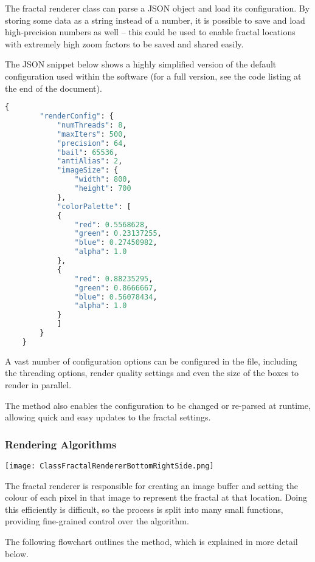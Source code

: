 The fractal renderer class can parse a JSON object and load its configuration. By storing some data as a string instead of a number, it is possible to save and load high-precision numbers as well -- this could be used to enable fractal locations with extremely high zoom factors to be saved and shared easily.

\vspace{0.5cm}
\noindent
The JSON snippet below shows a highly simplified version of the default configuration used within the software (for a full version, see the code listing at the end of the document).

\begin{lstlisting}[language=python]
	{
		"renderConfig": {
			"numThreads": 8,
			"maxIters": 500,
			"precision": 64,
			"bail": 65536,
			"antiAlias": 2,
			"imageSize": {
				"width": 800,
				"height": 700
			},
			"colorPalette": [
			{
				"red": 0.5568628,
				"green": 0.23137255,
				"blue": 0.27450982,
				"alpha": 1.0
			},
			{
				"red": 0.88235295,
				"green": 0.8666667,
				"blue": 0.56078434,
				"alpha": 1.0
			}
			]
		}
	}
\end{lstlisting}

A vast number of configuration options can be configured in the file, including the threading options, render quality settings and even the size of the boxes to render in parallel.

The  method also enables the configuration to be changed or re-parsed at runtime, allowing quick and easy updates to the fractal settings.

\subsubsection{Rendering Algorithms}

\FloatBarrier
\begin{figure*}[htp]
	\centering
	\texttt{[image: ClassFractalRendererBottomRightSide.png]}
\end{figure*}
\FloatBarrier

The fractal renderer is responsible for creating an image buffer and setting the colour of each pixel in that image to represent the fractal at that location. Doing this efficiently is difficult, so the process is split into many small functions, providing fine-grained control over the algorithm.

\vspace{0.5cm}
\noindent
The following flowchart outlines the  method, which is explained in more detail below.
\vspace{0.5cm}

